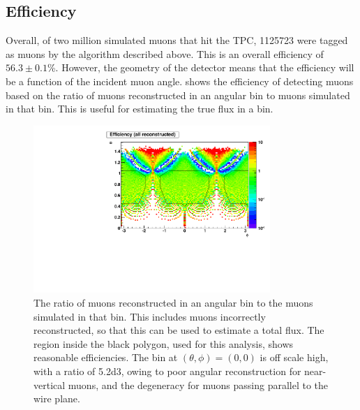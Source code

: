 \documentclass[herrin-thesis.tex]{subfiles}
\begin{document}
\subsection{Efficiency}
Overall, of two million simulated muons that hit the TPC, 1125723 were tagged as muons by the algorithm described above. This is an overall efficiency of \(56.3 \pm 0.1\)\%. However, the geometry of the detector means that the efficiency will be a function of the incident muon angle.  shows the efficiency of detecting muons based on the ratio of muons reconstructed in an angular bin to muons simulated in that bin. This is useful for estimating the true flux in a bin.

 \begin{figure}[htb]
 \centering
 \includegraphics[width=0.8\textwidth]{./plots/muon_efficiency.pdf}
 \caption[Efficiency of reconstructing muons as a function of angle]{The ratio of muons reconstructed in an angular bin to the muons simulated in that bin. This includes muons incorrectly reconstructed, so that this can be used to estimate a total flux. The region inside the black polygon, used for this analysis, shows reasonable efficiencies. The bin at \((\theta, \phi) = (0, 0)\) is off scale high, with a ratio of \num{5.2d3}, owing to poor angular reconstruction for near-vertical muons, and the degeneracy for muons passing parallel to the wire plane.}
 \label{fig:muon_efficiency}
 \end{figure}
 
\end{document}
